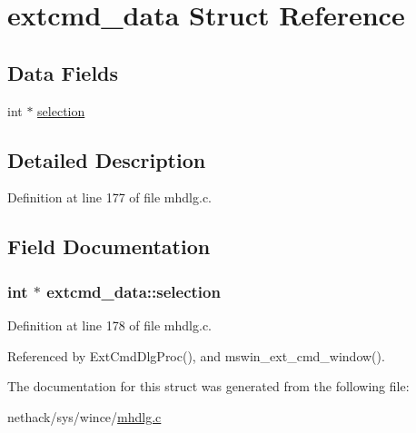 \hypertarget{structextcmd__data}{\section{extcmd\+\_\+data Struct Reference}
\label{structextcmd__data}
}
\subsection*{Data Fields}
\begin{DoxyCompactItemize}
\item 
int $\ast$ \hyperlink{structextcmd__data_ab011c2c8d46884e21377956420754497}{selection}
\end{DoxyCompactItemize}


\subsection{Detailed Description}


Definition at line 177 of file mhdlg.\+c.



\subsection{Field Documentation}
\hypertarget{structextcmd__data_ab011c2c8d46884e21377956420754497}{
\subsubsection[{selection}]{\setlength{\rightskip}{0pt plus 5cm}int $\ast$ extcmd\+\_\+data\+::selection}}\label{structextcmd__data_ab011c2c8d46884e21377956420754497}


Definition at line 178 of file mhdlg.\+c.



Referenced by Ext\+Cmd\+Dlg\+Proc(), and mswin\+\_\+ext\+\_\+cmd\+\_\+window().



The documentation for this struct was generated from the following file\+:\begin{DoxyCompactItemize}
\item 
nethack/sys/wince/\hyperlink{sys_2wince_2mhdlg_8c}{mhdlg.\+c}\end{DoxyCompactItemize}
